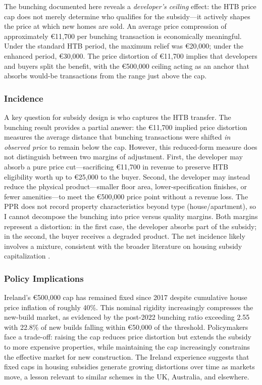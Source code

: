 \documentclass[12pt]{article}
\newcommand{\eur}[1]{\euro{}#1}
\begin{document}
The bunching documented here reveals a \textit{developer's ceiling} effect: the HTB price cap does not merely determine who qualifies for the subsidy---it actively shapes the price at which new homes are sold. An average price compression of approximately \eur{11,700} per bunching transaction is economically meaningful. Under the standard HTB period, the maximum relief was \eur{20,000}; under the enhanced period, \eur{30,000}. The price distortion of \eur{11,700} implies that developers and buyers split the benefit, with the \eur{500,000} ceiling acting as an anchor that absorbs would-be transactions from the range just above the cap.

\subsubsection*{Incidence} A key question for subsidy design is who captures the HTB transfer. The bunching result provides a partial answer: the \eur{11,700} implied price distortion measures the average distance that bunching transactions were shifted \textit{in observed price} to remain below the cap. However, this reduced-form measure does not distinguish between two margins of adjustment. First, the developer may absorb a pure price cut---sacrificing \eur{11,700} in revenue to preserve HTB eligibility worth up to \eur{25,000} to the buyer. Second, the developer may instead reduce the physical product---smaller floor area, lower-specification finishes, or fewer amenities---to meet the \eur{500,000} price point without a revenue loss. The PPR does not record property characteristics beyond type (house/apartment), so I cannot decompose the bunching into price versus quality margins. Both margins represent a distortion: in the first case, the developer absorbs part of the subsidy; in the second, the buyer receives a degraded product. The net incidence likely involves a mixture, consistent with the broader literature on housing subsidy capitalization \citep{hilber2016mortgage,eriksen2015vouchers,buttner2023homebuyer}.

\subsubsection*{Policy Implications} Ireland's \eur{500,000} cap has remained fixed since 2017 despite cumulative house price inflation of roughly 40\%. This nominal rigidity increasingly compresses the new-build market, as evidenced by the post-2022 bunching ratio exceeding 2.55 with 22.8\% of new builds falling within \eur{50,000} of the threshold. Policymakers face a trade-off: raising the cap reduces price distortion but extends the subsidy to more expensive properties, while maintaining the cap increasingly constrains the effective market for new construction. The Ireland experience suggests that fixed caps in housing subsidies generate growing distortions over time as markets move, a lesson relevant to similar schemes in the UK, Australia, and elsewhere.
\end{document}
